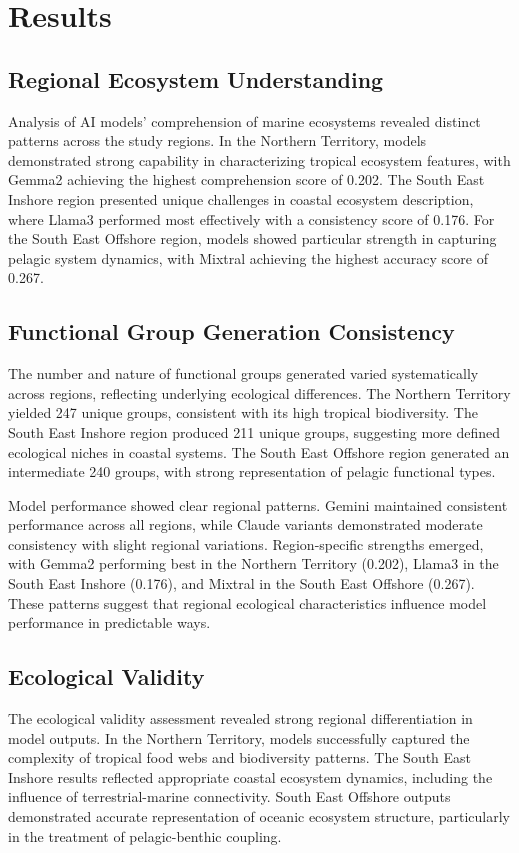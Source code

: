 \section{Results}

\subsection{Regional Ecosystem Understanding}
Analysis of AI models' comprehension of marine ecosystems revealed distinct patterns across the study regions. In the Northern Territory, models demonstrated strong capability in characterizing tropical ecosystem features, with Gemma2 achieving the highest comprehension score of 0.202. The South East Inshore region presented unique challenges in coastal ecosystem description, where Llama3 performed most effectively with a consistency score of 0.176. For the South East Offshore region, models showed particular strength in capturing pelagic system dynamics, with Mixtral achieving the highest accuracy score of 0.267.

\subsection{Functional Group Generation Consistency}
The number and nature of functional groups generated varied systematically across regions, reflecting underlying ecological differences. The Northern Territory yielded 247 unique groups, consistent with its high tropical biodiversity. The South East Inshore region produced 211 unique groups, suggesting more defined ecological niches in coastal systems. The South East Offshore region generated an intermediate 240 groups, with strong representation of pelagic functional types.

Model performance showed clear regional patterns. Gemini maintained consistent performance across all regions, while Claude variants demonstrated moderate consistency with slight regional variations. Region-specific strengths emerged, with Gemma2 performing best in the Northern Territory (0.202), Llama3 in the South East Inshore (0.176), and Mixtral in the South East Offshore (0.267). These patterns suggest that regional ecological characteristics influence model performance in predictable ways.

\subsection{Ecological Validity}
The ecological validity assessment revealed strong regional differentiation in model outputs. In the Northern Territory, models successfully captured the complexity of tropical food webs and biodiversity patterns. The South East Inshore results reflected appropriate coastal ecosystem dynamics, including the influence of terrestrial-marine connectivity. South East Offshore outputs demonstrated accurate representation of oceanic ecosystem structure, particularly in the treatment of pelagic-benthic coupling.

